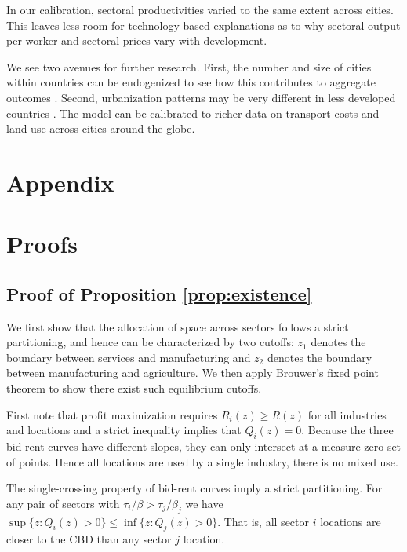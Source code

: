 \documentclass[12pt]{article}
\begin{document}
In our calibration, sectoral productivities varied to the same extent across cities. This leaves less room for technology-based explanations as to why sectoral output per worker and sectoral prices vary with development.

We see two avenues for further research. First, the number and size of cities within countries can be endogenized to see how this contributes to aggregate outcomes \cite{Desmet2013,Ramondo2016-qy}. Second, urbanization patterns may be very different in less developed countries \cite{Glaeser2014-gd,Harari2016-cx}. The model can be calibrated to richer data on transport costs and land use across cities around the globe.
\clearpage




\clearpage

\appendix
\section*{Appendix}
\section{Proofs}
\subsection{Proof of Proposition \ref{prop:existence}}
We first show that the allocation of space across sectors follows a strict partitioning, and hence can be characterized by two cutoffs: $z_1$ denotes the boundary between services and manufacturing and $z_2$ denotes the boundary between manufacturing and agriculture. We then apply Brouwer's fixed point theorem to show there exist such equilibrium cutoffs.

First note that profit maximization requires $R_i(z)\ge R(z)$ for all industries and locations and a strict inequality implies that $Q_i(z)=0$. Because the three bid-rent curves have different slopes, they can only intersect at a measure zero set of points. Hence all locations are used by a single industry, there is no mixed use.

The single-crossing property of bid-rent curves imply a strict partitioning. For any pair of sectors with $\tau_i/\beta>\tau_j/\beta_j$ we have $\sup\{z: Q_i(z)>0\} \le \inf\{z: Q_j(z)>0\}$. That is, all sector $i$ locations are closer to the CBD than any sector $j$ location.
\end{document}
